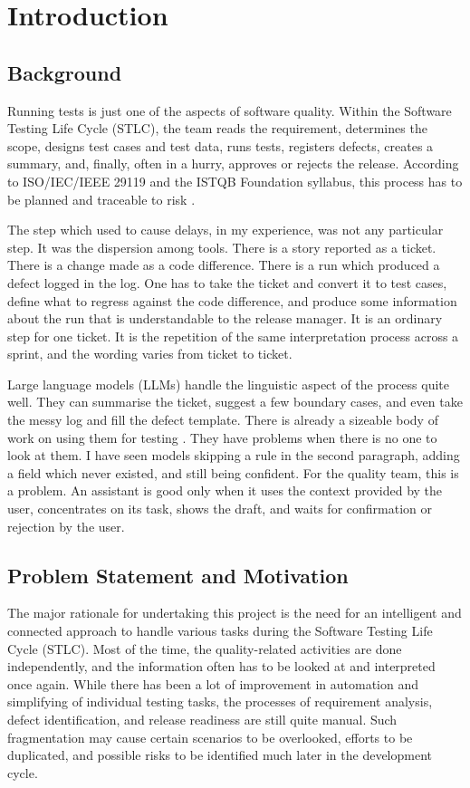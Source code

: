 \chapter{Introduction}
\label{chap:introduction}

\section{Background}
Running tests is just one of the aspects of software quality. Within the Software Testing Life Cycle (STLC), the team reads the requirement, determines the scope, designs test cases and test data, runs tests, registers defects, creates a summary, and, finally, often in a hurry, approves or rejects the release. According to ISO/IEC/IEEE 29119 and the ISTQB Foundation syllabus, this process has to be planned and traceable to risk \cite{iso29119,istqb2023}.

The step which used to cause delays, in my experience, was not any particular step. It was the dispersion among tools. There is a story reported as a ticket. There is a change made as a code difference. There is a run which produced a defect logged in the log. One has to take the ticket and convert it to test cases, define what to regress against the code difference, and produce some information about the run that is understandable to the release manager. It is an ordinary step for one ticket. It is the repetition of the same interpretation process across a sprint, and the wording varies from ticket to ticket.

Large language models (LLMs) handle the linguistic aspect of the process quite well. They can summarise the ticket, suggest a few boundary cases, and even take the messy log and fill the defect template. There is already a sizeable body of work on using them for testing \cite{wang2024testingllm}. They have problems when there is no one to look at them. I have seen models skipping a rule in the second paragraph, adding a field which never existed, and still being confident. For the quality team, this is a problem. An assistant is good only when it uses the context provided by the user, concentrates on its task, shows the draft, and waits for confirmation or rejection by the user.

\section{Problem Statement and Motivation}
The major rationale for undertaking this project is the need for an intelligent and connected approach to handle various tasks during the Software Testing Life Cycle (STLC). Most of the time, the quality-related activities are done independently, and the information often has to be looked at and interpreted once again. While there has been a lot of improvement in automation and simplifying of individual testing tasks, the processes of requirement analysis, defect identification, and release readiness are still quite manual. Such fragmentation may cause certain scenarios to be overlooked, efforts to be duplicated, and possible risks to be identified much later in the development cycle.

